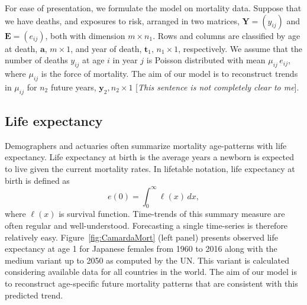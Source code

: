 \documentclass[a4paper,twoside, openright, 12pt, leqno]{article}
\begin{document}
For ease of presentation, we formulate the model on mortality data. Suppose that we have deaths, and exposures to risk, arranged in two matrices, 
$\bm{Y} = (y_{ij})$ and $\bm{E} = (e_{ij})$, both with dimension $m \times n_{1}$.  Rows and columns are classified by age at death, $\bm{a}, \,m \times 1$, and year of death, $\bm{t}_{1}, \,n_{1} \times 1$, respectively.  
We assume that the number of deaths $y_{ij}$ at age $i$ in year $j$ is Poisson distributed with mean $\mu_{ij} \,e_{ij}$, where $\mu_{ij}$ is the force of mortality. 
The aim of our model is to reconstruct trends in $\mu_{ij}$ for  $n_{2}$ future years, $\bm{y}_{2}, n_{2} \times 1$ [\textit{This sentence is not completely clear to me}].

\subsection{Life expectancy}

Demographers and actuaries often summarize mortality age-patterns with life expectancy. Life expectancy at birth is the average years a newborn is expected to live given the current mortality rates. In lifetable notation, life expectancy at birth is defined as
\begin{equation*}\label{eq:ex}
e(0)=\int_0^\infty\ell(x)\,dx,
\end{equation*}
where $\ell(x)$ is survival function. Time-trends of this summary measure are often regular and well-understood. Forecasting a single time-series is therefore relatively easy. Figure~\ref{fig:CamardaMort} (left panel) presents observed life expectancy at age 1 for Japanese females from 1960 to 2016 along with the medium variant up to 2050 as computed by the UN. This variant is calculated considering available data for all countries in the world.  The aim of our model is to reconstruct age-specific future mortality patterns that are consistent with this predicted trend.
\end{document}

